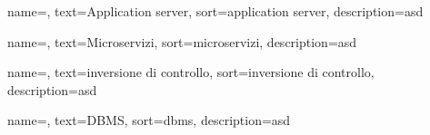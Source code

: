 {
    name=,
    text=Application server,
    sort=application server,
    description=asd
}

{
    name=,
    text=Microservizi,
    sort=microservizi,
    description=asd
}

{
    name=,
    text=inversione di controllo,
    sort=inversione di controllo,
    description=asd
}

{
    name=,
    text=DBMS,
    sort=dbms,
    description=asd
}